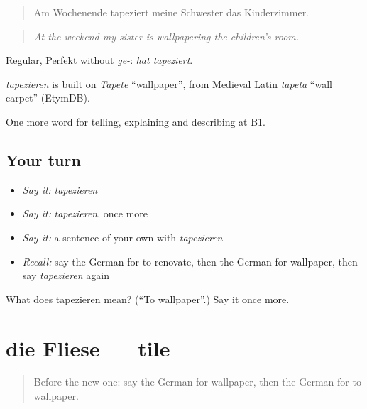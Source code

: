 \begin{quote}
Am Wochenende tapeziert meine Schwester das Kinderzimmer.
\end{quote}

\begin{quote}
\emph{At the weekend my sister is wallpapering the children's room.}
\end{quote}

Regular, Perfekt without \emph{ge-}: \emph{hat tapeziert}.

\begin{cousinweb}
\emph{tapezieren} is built on \emph{Tapete} \textquotedblleft{}wallpaper\textquotedblright{}, from Medieval Latin \emph{tapeta} \textquotedblleft{}wall carpet\textquotedblright{} (EtymDB).
\end{cousinweb}

\begin{grammarlens}[title={What you've built}]
One more word for telling, explaining and describing at B1.
\end{grammarlens}

\subsection*{Your turn}
\begin{itemize}
\raggedright
  \item \emph{Say it:} \emph{tapezieren}
  \item \emph{Say it:} \emph{tapezieren}, once more
  \item \emph{Say it:} a sentence of your own with \emph{tapezieren}
  \item \emph{Recall:} say the German for to renovate, then the German for wallpaper, then say \emph{tapezieren} again
\end{itemize}

\begin{tcolorbox}[breakable,colback=teal!4,colframe=teal!35!black,title={Before you move on}]
What does tapezieren mean? (\textquotedblleft{}To wallpaper\textquotedblright{}.) Say it once more.
\end{tcolorbox}
\section[die Fliese]{die Fliese — tile}

\label{lesson:GE-C529-fliese}



\begin{quote}
Before the new one: say the German for wallpaper, then the German for to wallpaper.
\end{quote}

